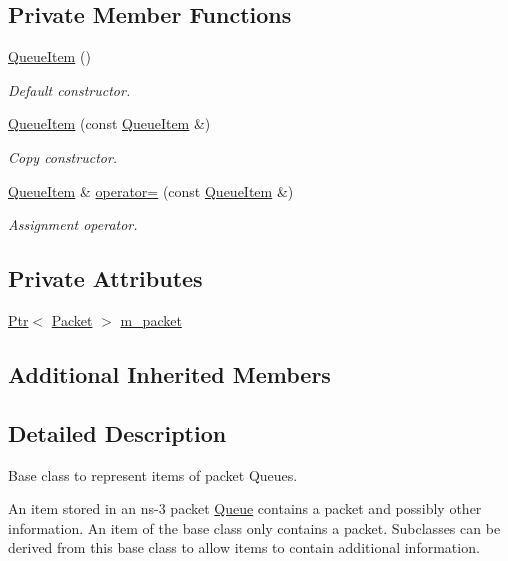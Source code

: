 \subsection*{Private Member Functions}
\begin{DoxyCompactItemize}
\item 
\hyperlink{classns3_1_1QueueItem_a3e05440519b4ea058da315d4ff7ae95a}{Queue\+Item} ()
\begin{DoxyCompactList}\small\item\em Default constructor. \end{DoxyCompactList}\item 
\hyperlink{classns3_1_1QueueItem_a73c4babb82a0bf661fc45a039c82f8bb}{Queue\+Item} (const \hyperlink{classns3_1_1QueueItem}{Queue\+Item} \&)
\begin{DoxyCompactList}\small\item\em Copy constructor. \end{DoxyCompactList}\item 
\hyperlink{classns3_1_1QueueItem}{Queue\+Item} \& \hyperlink{classns3_1_1QueueItem_a87c8723782641f7c4c37de4cf8ad510d}{operator=} (const \hyperlink{classns3_1_1QueueItem}{Queue\+Item} \&)
\begin{DoxyCompactList}\small\item\em Assignment operator. \end{DoxyCompactList}\end{DoxyCompactItemize}
\subsection*{Private Attributes}
\begin{DoxyCompactItemize}
\item 
\hyperlink{classns3_1_1Ptr}{Ptr}$<$ \hyperlink{classns3_1_1Packet}{Packet} $>$ \hyperlink{classns3_1_1QueueItem_aedb86761627cf4d885b3c0a9969099cf}{m\+\_\+packet}
\end{DoxyCompactItemize}
\subsection*{Additional Inherited Members}


\subsection{Detailed Description}
Base class to represent items of packet Queues. 

An item stored in an ns-\/3 packet \hyperlink{classns3_1_1Queue}{Queue} contains a packet and possibly other information. An item of the base class only contains a packet. Subclasses can be derived from this base class to allow items to contain additional information. 

